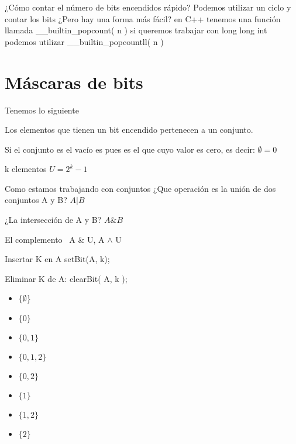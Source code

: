 ¿Cómo contar el número de bits encendidos rápido? Podemos utilizar un ciclo y contar los bits ¿Pero hay una forma más fácil? \break 
en C++ tenemos una función llamada \textsf{\_\_builtin\_popcount( n )} si queremos trabajar con \textsf{long long int} podemos utilizar \textsf{\_\_builtin\_popcountll( n )}

\section{Máscaras de bits}
Tenemos lo siguiente

Los elementos que tienen un bit encendido pertenecen a un conjunto.

Si el conjunto es el vacío es pues es el que cuyo valor es cero, es decir: \newline 
$\emptyset = 0$ \newline

k elementos \newline 
$U=2^{k} - 1$ \newline

Como estamos trabajando con conjuntos ¿Que operación es la unión de dos conjuntos A y B? \newline 
$A | B$ \newline

¿La intersección de A y B? \newline
$A \& B$ \newline

El complemento \newline 
~A $\&$ U, A $\wedge$ U\newline

Insertar K en A \newline
setBit(A, k); \newline 

Eliminar K de A: \newline 
clearBit( A, k ); \newline 

\begin{itemize}
    \item { $\{\emptyset$\} }
    \item { $\{0\}$ }
    \item { $\{0, 1\}$ }
    \item { $\{0, 1, 2\}$ }
    \item { $\{0, 2\}$ }
    \item { $\{1\}$ }
    \item { $\{1, 2\}$ }
    \item { $\{2\}$ }
\end{itemize}

